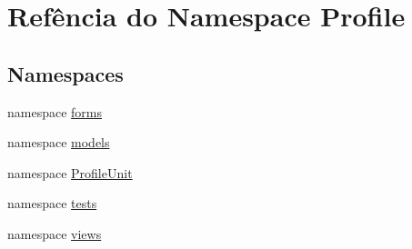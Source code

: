 \hypertarget{namespaceProfile}{\section{Refência do Namespace Profile}
\label{d8/dc2/namespaceProfile}
}
\subsection*{Namespaces}
\begin{DoxyCompactItemize}
\item 
namespace \hyperlink{namespaceProfile_1_1forms}{forms}
\item 
namespace \hyperlink{namespaceProfile_1_1models}{models}
\item 
namespace \hyperlink{namespaceProfile_1_1ProfileUnit}{Profile\-Unit}
\item 
namespace \hyperlink{namespaceProfile_1_1tests}{tests}
\item 
namespace \hyperlink{namespaceProfile_1_1views}{views}
\end{DoxyCompactItemize}
